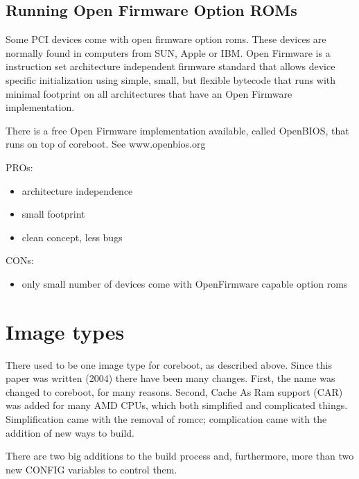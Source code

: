 \documentclass[titlepage,12pt]{article}
\begin{document}
\subsection{Running Open Firmware Option ROMs}

Some PCI devices come with open firmware option roms. These devices are
normally found in computers from SUN, Apple or IBM. Open Firmware is a
instruction set architecture independent firmware standard that allows
device specific initialization using simple, small, but flexible
bytecode that runs with minimal footprint on all architectures that have
an Open Firmware implementation.

There is a free Open Firmware implementation available, called OpenBIOS,
that runs on top of coreboot. See www.openbios.org

PROs:
 \begin{itemize}
 \item architecture independence
 \item small footprint
 \item clean concept, less bugs
 \end{itemize}

CONs:
 \begin{itemize}
 \item only small number of devices come with OpenFirmware capable option roms
 \end{itemize}

%
%

\section{Image types}
There used to be one image type for coreboot, as described above. Since this paper was written (2004) there have been many changes. First, the name 
was changed to coreboot, for many reasons. Second, Cache As Ram support (CAR)
was added for many AMD CPUs, which both simplified and complicated things. Simplification came with the removal of romcc; complication came with the addition of new ways to build. 

There are two big additions to the build process and, furthermore, more than two new CONFIG variables to control them. 
\end{document}
